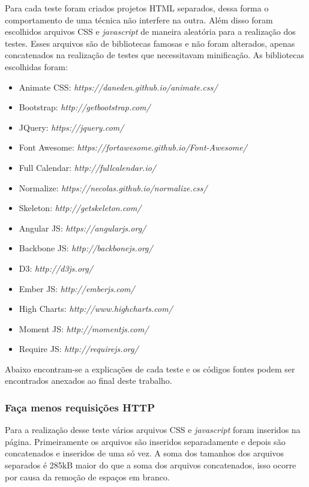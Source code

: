 Para cada teste foram criados projetos HTML separados, dessa forma o comportamento de uma técnica não interfere na outra. Além disso foram escolhidos arquivos CSS e \textit{javascript} de maneira aleatória para a realização dos testes. Esses arquivos são de bibliotecas famosas e não foram alterados, apenas concatenados na realização de testes que necessitavam minificação. As bibliotecas escolhidas foram:

\begin{itemize}
	\item Animate CSS: \textit{https://daneden.github.io/animate.css/}
	\item Bootstrap: \textit{http://getbootstrap.com/}
	\item JQuery: \textit{https://jquery.com/}
	\item Font Awesome: \textit{https://fortawesome.github.io/Font-Awesome/}
	\item Full Calendar: \textit{http://fullcalendar.io/}
	\item Normalize: \textit{https://necolas.github.io/normalize.css/}
	\item Skeleton: \textit{http://getskeleton.com/}
	\item Angular JS: \textit{https://angularjs.org/}
	\item Backbone JS: \textit{http://backbonejs.org/}
	\item D3: \textit{http://d3js.org/}
	\item Ember JS: \textit{http://emberjs.com/}
	\item High Charts: \textit{http://www.highcharts.com/}
	\item Moment JS: \textit{http://momentjs.com/}
	\item Require JS: \textit{http://requirejs.org/}
\end{itemize}

Abaixo encontram-se a explicações de cada teste e os códigos fontes podem ser encontrados anexados ao final deste trabalho.

\subsubsection{Faça menos requisições HTTP}
\label{facamenosrequisicoeshttp}

Para a realização desse teste vários arquivos CSS e \textit{javascript} foram inseridos na página. Primeiramente os arquivos são inseridos separadamente e depois são concatenados e inseridos de uma só vez. A soma dos tamanhos dos arquivos separados é 285kB maior do que a soma dos arquivos concatenados, isso ocorre por causa da remoção de espaços em branco.

